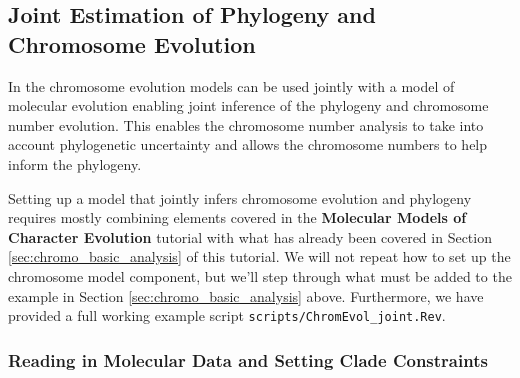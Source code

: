 \medskip
\subsection{Joint Estimation of Phylogeny and Chromosome Evolution}\label{subsect:joint_estimation}


In \RevBayes the chromosome evolution models can be used jointly with a model of molecular evolution 
enabling joint inference of the phylogeny and chromosome number evolution.
This enables the chromosome number analysis to take into account phylogenetic uncertainty 
and allows the chromosome numbers to help inform the phylogeny. 

Setting up a model that jointly infers chromosome evolution and phylogeny requires mostly combining
elements covered in the \textbf{Molecular Models of Character Evolution} tutorial with
what has already been covered in Section \ref{sec:chromo_basic_analysis} of this tutorial. We will not repeat how to set up the chromosome model
component, but we'll step through what must be added to the example in Section \ref{sec:chromo_basic_analysis} above.
Furthermore, we have provided a full working example script \texttt{scripts/ChromEvol\_joint.Rev}.

\subsubsection{Reading in Molecular Data and Setting Clade Constraints}

